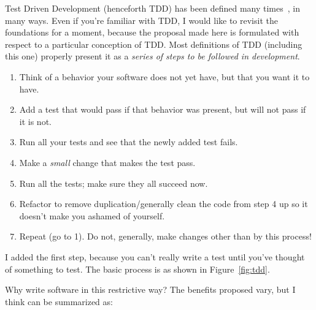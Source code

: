 \documentclass[sigplan,screen]{acmart}
\begin{document}
Test Driven Development (henceforth TDD) has been defined many times~\cite{beck2002test,astels2003test,TDDIBM,TDDAcademy},
in many ways.  Even if you're familiar with TDD, I would like to
revisit the foundations for a moment, because the proposal made here
is formulated with respect to a particular conception of TDD.  Most
definitions of TDD (including this one) properly present it as a
\emph{series of steps to be followed in development}.

\begin{enumerate}
  \item Think of a behavior your software does not yet have,
    but that you want it to have.
    \item Add a test that would pass if that behavior was present, but
      will not pass if it is not.
    \item Run all your tests and see that the newly added test fails.
    \item Make a \emph{small} change that makes the test pass.
    \item Run all the tests; make sure they all succeed now.
      \item Refactor to remove duplication/generally clean the code
        from step 4 up so it doesn't make you ashamed of yourself.
        \item Repeat (go to 1).  Do not, generally, make changes other than by
          this process!
      \end{enumerate}

I added the first step, because you can't really write a test until
you've thought of something to test.  The basic process is as shown in Figure~\ref{fig:tdd}.


Why write software in this restrictive way?  The benefits proposed
vary, but I think can be summarized as:
\end{document}
